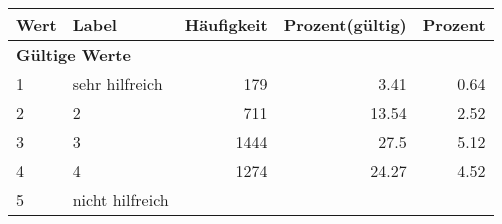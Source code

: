      \begin{longtable}{lXrrr}
     \toprule
     \textbf{Wert} & \textbf{Label} & \textbf{Häufigkeit} & \textbf{Prozent(gültig)} & \textbf{Prozent} \\
     \endhead
     \midrule
     \multicolumn{5}{l}{\textbf{Gültige Werte}}\\

     1 &
     \multicolumn{1}{X}{ sehr hilfreich   } &


       \num{179} &
       \num[round-mode=places,round-precision=2]{3,41} &
         \num[round-mode=places,round-precision=2]{0,64} \\

     2 &
     \multicolumn{1}{X}{ 2   } &


       \num{711} &
       \num[round-mode=places,round-precision=2]{13,54} &
         \num[round-mode=places,round-precision=2]{2,52} \\

     3 &
     \multicolumn{1}{X}{ 3   } &


       \num{1444} &
       \num[round-mode=places,round-precision=2]{27,5} &
         \num[round-mode=places,round-precision=2]{5,12} \\

     4 &
     \multicolumn{1}{X}{ 4   } &


       \num{1274} &
       \num[round-mode=places,round-precision=2]{24,27} &
         \num[round-mode=places,round-precision=2]{4,52} \\

     5 &
     \multicolumn{1}{X}{ nicht hilfreich   } &



\end{longtable}
